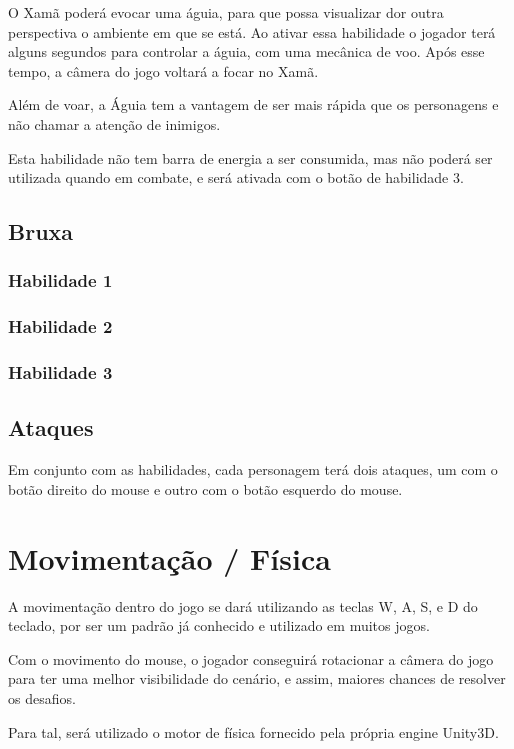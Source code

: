 O Xamã poderá evocar uma águia, para que possa visualizar dor outra perspectiva o ambiente em que se está. Ao ativar essa habilidade o jogador terá alguns segundos para controlar a águia, com uma mecânica de voo. Após esse tempo, a câmera do jogo voltará a focar no Xamã.

Além de voar, a Águia tem a vantagem de ser mais rápida que os personagens e não chamar a atenção de inimigos.

Esta habilidade não tem barra de energia a ser consumida, mas não poderá ser utilizada quando em combate, e será ativada com o botão de habilidade 3. 


\subsection{Bruxa}

\subsubsection{Habilidade 1}

\subsubsection{Habilidade 2}

\subsubsection{Habilidade 3}


\subsection{Ataques}
Em conjunto com as habilidades, cada personagem terá dois ataques, um com o botão direito do mouse e outro com o botão esquerdo do mouse. 


\section{Movimentação / Física}
A movimentação dentro do jogo se dará utilizando as teclas W, A, S, e D do teclado, por ser um padrão já conhecido e utilizado em muitos jogos.

Com o movimento do mouse, o jogador conseguirá rotacionar a câmera do jogo para ter uma melhor visibilidade do cenário, e assim, maiores chances de resolver os desafios.

Para tal, será utilizado o motor de física fornecido pela própria engine Unity3D.

